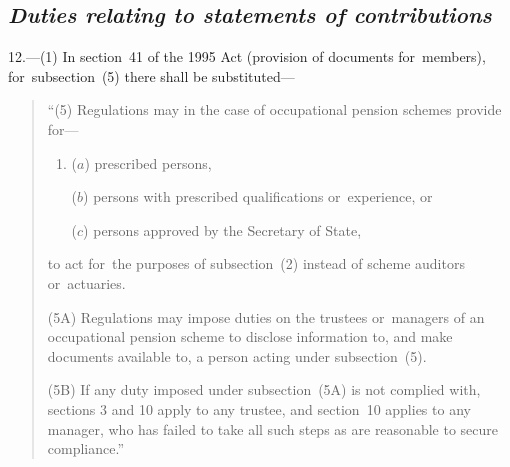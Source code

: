 \documentclass[12pt,a4paper]{article}
\begin{document}
\subsection*{\itshape Duties relating to statements of contributions}

12.---(1) In section~41 of the 1995 Act (provision of documents for~members), for~subsection~(5)  there shall be substituted—
\begin{quotation}
“(5) Regulations may in the case of occupational pension schemes provide for—
\begin{enumerate}\item[]
($a$) prescribed persons,

($b$) persons with prescribed qualifications or~experience, or

($c$) persons approved by the Secretary of State,
\end{enumerate}
to act for~the purposes of subsection~(2)  instead of scheme auditors or~actuaries.

(5A) Regulations may impose duties on the trustees or~managers of an occupational pension scheme to disclose information to, and make documents available to, a person acting under subsection~(5).

(5B) If any duty imposed under subsection~(5A)  is not complied with, sections 3 and 10 apply to any trustee, and section~10 applies to any manager, who has failed to take all such steps as are reasonable to secure compliance.”
\end{quotation}

%
%
%
%
%
%
\end{document}

